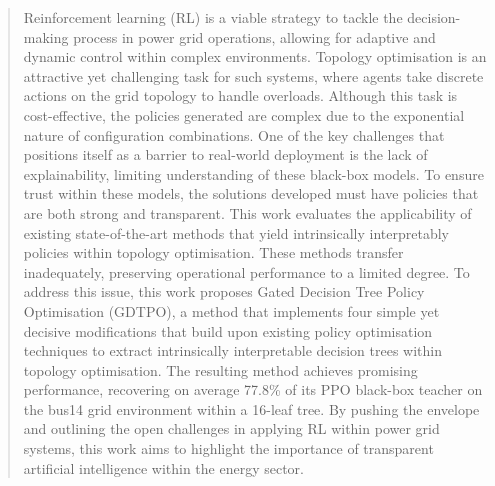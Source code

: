 \documentclass[12pt,twoside]{report}
\date{September 2026}
\begin{document}
\raggedbottom



\clearpage{\pagestyle{empty}\cleardoublepage}
\setcounter{page}{1}
\pagestyle{fancy}

\begin{abstract}

Reinforcement learning (RL) is a viable strategy to tackle the decision-making process in power grid operations, allowing for adaptive and dynamic control within complex environments. Topology optimisation is an attractive yet challenging task for such systems, where agents take discrete actions on the grid topology to handle overloads. Although this task is cost-effective, the policies generated are complex due to the exponential nature of configuration combinations. One of the key challenges that positions itself as a barrier to real-world deployment is the lack of explainability, limiting understanding of these black-box models. To ensure trust within these models, the solutions developed must have policies that are both strong and transparent. This work evaluates the applicability of existing state-of-the-art methods that yield intrinsically interpretably policies within topology optimisation. These methods transfer inadequately, preserving operational performance to a limited degree. To address this issue, this work proposes Gated Decision Tree Policy Optimisation (GDTPO), a method that implements four simple yet decisive modifications that build upon existing policy optimisation techniques to extract intrinsically interpretable decision trees within topology optimisation. The resulting method achieves promising performance, recovering on average 77.8\% of its PPO black-box teacher on the bus14 grid environment within a 16-leaf tree. By pushing the envelope and outlining the open challenges in applying RL within power grid systems, this work aims to highlight the importance of transparent artificial intelligence within the energy sector.

\end{abstract}
\end{document}
